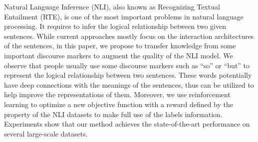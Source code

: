 Natural Language Inference (NLI), also known as Recognizing Textual Entailment (RTE), is one of the most important problems in natural language processing. It requires to infer the logical relationship between two given sentences. While current approaches mostly focus on the interaction architectures of the sentences, in this paper, we propose to transfer knowledge from some important discourse markers to augment the quality of the NLI model. We observe that people usually use some discourse markers such as ``so'' or ``but'' to represent the logical relationship between two sentences. These words potentially have deep connections with the meanings of the sentences, thus can be utilized to help improve the representations of them. Moreover, we use reinforcement learning to optimize a new objective function with a reward defined by the property of the NLI datasets to make full use of the labels information. Experiments show that our method achieves the state-of-the-art performance on several large-scale datasets.
